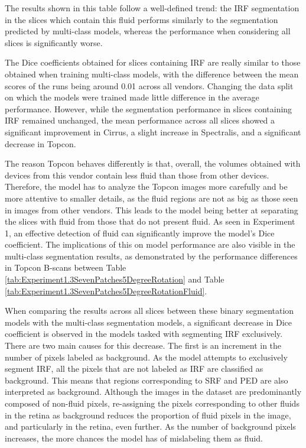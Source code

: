 The results shown in this table follow a well-defined trend: the IRF segmentation in the slices which contain this fluid performs similarly to the segmentation predicted by multi-class models, whereas the performance when considering all slices is significantly worse.
\par
The Dice coefficients obtained for slices containing IRF are really similar to those obtained when training multi-class models, with the difference between the mean scores of the runs being around 0.01 across all vendors. Changing the data split on which the models were trained made little difference in the average performance. However, while the segmentation performance in slices containing IRF remained unchanged, the mean performance across all slices showed a significant improvement in Cirrus, a slight increase in Spectralis, and a significant decrease in Topcon. 
\par
The reason Topcon behaves differently is that, overall, the volumes obtained with devices from this vendor contain less fluid than those from other devices. Therefore, the model has to analyze the Topcon images more carefully and be more attentive to smaller details, as the fluid regions are not as big as those seen in images from other vendors. This leads to the model being better at separating the slices with fluid from those that do not present fluid. As seen in Experiment 1, an effective detection of fluid can significantly improve the model's Dice coefficient. The implications of this on model performance are also visible in the multi-class segmentation results, as demonstrated by the performance differences in Topcon B-scans between Table \ref{tab:Experiment1.3SevenPatches5DegreeRotation} and Table \ref{tab:Experiment1.3SevenPatches5DegreeRotationFluid}.
\par
When comparing the results across all slices between these binary segmentation models with the multi-class segmentation models, a significant decrease in Dice coefficient is observed in the models tasked with segmenting IRF exclusively. There are two main causes for this decrease. The first is an increment in the number of pixels labeled as background. As the model attempts to exclusively segment IRF, all the pixels that are not labeled as IRF are classified as background. This means that regions corresponding to SRF and PED are also interpreted as background. Although the images in the dataset are predominantly composed of non-fluid pixels, re-assigning the pixels corresponding to other fluids in the retina as background reduces the proportion of fluid pixels in the image, and particularly in the retina, even further. As the number of background pixels increases, the more chances the model has of mislabeling them as fluid.
